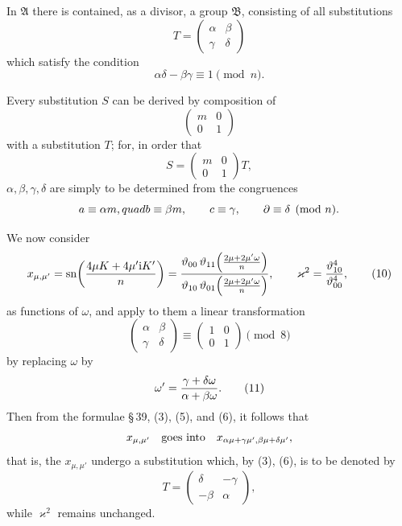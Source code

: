 \documentclass[11pt]{article}
\providecommand{\sn}{\operatorname{sn}}
\providecommand{\ii}{\mathrm{i}}
\begin{document}
In $\mathfrak A$ there is contained, as a divisor, a group $\mathfrak B$, consisting of all
substitutions
\begin{equation}
 T=\begin{pmatrix}\alpha&\beta\\ \gamma&\delta\end{pmatrix}
\tag{8}
\end{equation}
which satisfy the condition
\begin{equation}
 \alpha\delta-\beta\gamma\equiv1\pmod n.
\tag{9}
\end{equation}

Every substitution $S$ can be derived by composition of
\[
 \begin{pmatrix}m&0\\0&1\end{pmatrix}
\]
with a substitution $T$; for, in order that
\[
 S=\begin{pmatrix}m&0\\0&1\end{pmatrix}T,
\]
$\alpha,\beta,\gamma,\delta$ are simply to be determined from the congruences
\[
 a\equiv\alpha m,\\quad b\equiv\beta m,
 \qquad c\equiv\gamma,
 \qquad \partial\equiv\delta\pmod n.
\]

We now consider
\begin{equation}
 x_{\mu,\mu'}=
 \sn\!\left({4\mu K+4\mu'\ii K'\over n}\right)
 ={\vartheta_{00}\,\vartheta_{11}\!\left({2\mu+2\mu'\omega\over n}\right)
 \over
 \vartheta_{10}\,\vartheta_{01}\!\left({2\mu+2\mu'\omega\over n}\right)},
 \qquad
 \varkappa^2={\vartheta_{10}^{4}\over\vartheta_{00}^{4}},
\tag{10}
\end{equation}
as functions of $\omega$, and apply to them a linear transformation
\[
 \begin{pmatrix}\alpha&\beta\\ \gamma&\delta\end{pmatrix}
 \equiv
 \begin{pmatrix}1&0\\0&1\end{pmatrix}\pmod 8
\]
by replacing $\omega$ by
\begin{equation}
 \omega'={\gamma+\delta\omega\over\alpha+\beta\omega}.
\tag{11}
\end{equation}
Then from the formulae \S\,39, (3), (5), and (6), it follows that
\[
 x_{\mu,\mu'}\quad\hbox{goes into}\quad
 x_{\alpha\mu+\gamma\mu',\beta\mu+\delta\mu'},
\]
that is, the $x_{\mu,\mu'}$ undergo a substitution which, by (3), (6), is to be denoted by
\[
 T=\begin{pmatrix}\delta&-\gamma\\ -\beta&\alpha\end{pmatrix},
\]
while $\varkappa^2$ remains unchanged.
\end{document}
